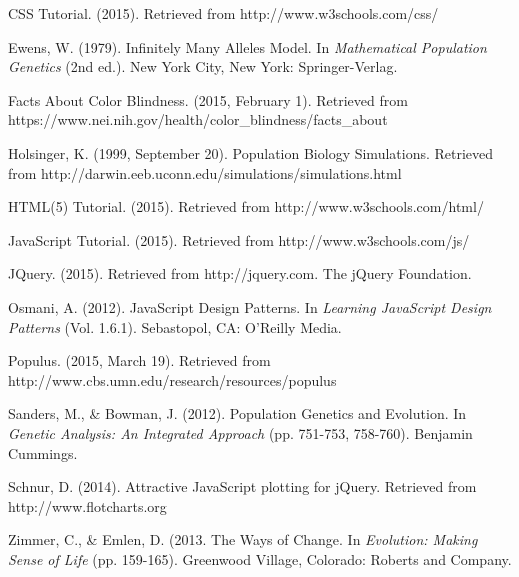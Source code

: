 \documentclass[12pt]{article}
\begin{document}
\begin{spacing}{1.6}
\begin{thebibliography}{9}
CSS Tutorial. (2015). Retrieved from http://www.w3schools.com/css/

Ewens, W. (1979). Infinitely Many Alleles Model. In \textit{Mathematical Population Genetics} (2nd ed.). New York City, New York: Springer-Verlag.

Facts About Color Blindness. (2015, February 1). Retrieved from https://www.nei.nih.gov/health/color\_blindness/facts\_about

Holsinger, K. (1999, September 20). Population Biology Simulations. Retrieved from http://darwin.eeb.uconn.edu/simulations/simulations.html

HTML(5) Tutorial. (2015). Retrieved from http://www.w3schools.com/html/

JavaScript Tutorial. (2015). Retrieved from http://www.w3schools.com/js/

JQuery. (2015). Retrieved from http://jquery.com. The jQuery Foundation.

Osmani, A. (2012). JavaScript Design Patterns. In \textit{Learning JavaScript Design Patterns} (Vol. 1.6.1). Sebastopol, CA: O'Reilly Media.

Populus. (2015, March 19). Retrieved from http://www.cbs.umn.edu/research/resources/populus

Sanders, M., \& Bowman, J. (2012). Population Genetics and Evolution. In \textit{Genetic Analysis: An Integrated Approach} (pp. 751-753, 758-760). Benjamin Cummings.

Schnur, D. (2014). Attractive JavaScript plotting for jQuery. Retrieved from http://www.flotcharts.org

Zimmer, C., \& Emlen, D. (2013. The Ways of Change. In \textit{Evolution: Making Sense of Life} (pp. 159-165). Greenwood Village, Colorado: Roberts and Company.

\end{thebibliography}

\end{spacing}
\end{document}
